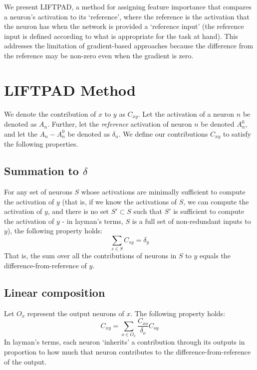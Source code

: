 \documentclass{article}
\begin{document}
We present LIFTPAD, a method for assigning feature importance that compares a neuron's activation to its `reference', where the reference is the activation that the neuron has when the network is provided a `reference input' (the reference input is defined according to what is appropriate for the task at hand). This addresses the limitation of gradient-based approaches because the difference from the reference may be non-zero even when the gradient is zero.

\vspace{-10px}
\section{LIFTPAD Method}
\label{LIFTPAD}

We denote the contribution of $x$ to $y$ as $C_{xy}$. Let the activation of a neuron $n$ be denoted as $A_n$. Further, let the \emph{reference} activation of neuron $n$ be denoted $A_n^0$, and let the $A_n - A_n^0$ be denoted as $\delta_n$. We define our contributions $C_{xy}$ to satisfy the following properties.

\vspace{-5px}
\subsection{Summation to $\delta$}

For any set of neurons $S$ whose activations are minimally sufficient to compute the activation of $y$ (that is, if we know the activations of $S$, we can compute the activation of $y$, and there is no set $S' \subset S$ such that $S'$ is sufficient to compute the activation of $y$ - in layman's terms, $S$ is a full set of non-redundant inputs to $y$), the following property holds:
\begin{equation}
\sum_{s \in S} C_{sy} = \delta_y
\end{equation}
That is, the sum over all the contributions of neurons in $S$ to $y$ equals the difference-from-reference of $y$.

\subsection{Linear composition}

Let $O_x$ represent the output neurons of $x$. The following property holds:\\
\begin{equation}
C_{xy} = \sum_{o \in O_x} \frac{C_{xo}}{\delta_o}C_{oy}
\end{equation}
In layman's terms, each neuron `inherits' a contribution through its outputs in proportion to how much that neuron contributes to the difference-from-reference of the output.
\end{document}
